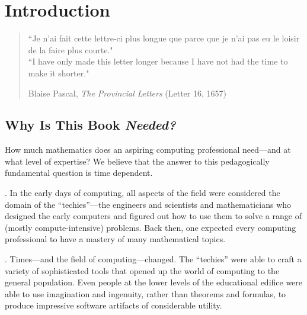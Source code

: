 
\chapter{Introduction}
\label{ch:intro}

\begin{quote}
``Je n'ai fait cette lettre-ci plus longue que parce que je n'ai pas eu le loisir de la faire plus courte."  \\
``I have only made this letter longer because I have not had the time to make it shorter."

\hspace*{1.5in}Blaise Pascal, {\it The Provincial Letters} (Letter 16, 1657)
\end{quote}


\section{Why Is This Book {\em Needed?}}
\label{sec:bookneeded}

How much mathematics does an aspiring computing professional need---and at what level of expertise?  We believe that the answer to this pedagogically fundamental question is time dependent.

\medskip

.
In the early days of computing, all aspects of the field were considered the domain of the ``techies''---the engineers and scientists and mathematicians who designed the early computers and figured out how to use them to solve a range of (mostly compute-intensive) problems.  Back then, one expected every computing professional to have a mastery of many mathematical topics.

\medskip

.
Times---and the field of computing---changed.  The ``techies'' were able to craft a variety of sophisticated tools that opened up the world of computing to the general population.  Even people at the lower levels of the educational edifice were able to use imagination and ingenuity, rather than theorems and formulas, to produce impressive software artifacts of considerable utility.

\medskip

